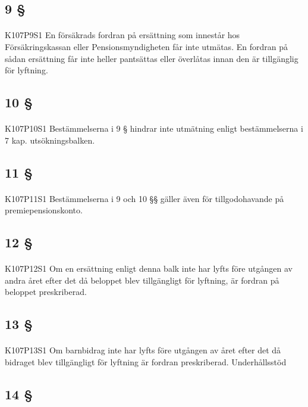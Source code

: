 \documentclass[a4paper,notitlepage,openany,10pt]{book}
\begin{document}
\subsection*{9 §}
\paragraph*{}
{\tiny K107P9S1}
En försäkrads fordran på ersättning som innestår hos Försäkringskassan eller Pensionsmyndigheten får inte utmätas.
En fordran på sådan ersättning får inte heller pantsättas eller överlåtas innan den är tillgänglig för lyftning.
\subsection*{10 §}
\paragraph*{}
{\tiny K107P10S1}
Bestämmelserna i 9 § hindrar inte utmätning enligt bestämmelserna i 7 kap. utsökningsbalken.
\subsection*{11 §}
\paragraph*{}
{\tiny K107P11S1}
Bestämmelserna i 9 och 10 §§ gäller även för tillgodohavande på premiepensionskonto.
\subsection*{12 §}
\paragraph*{}
{\tiny K107P12S1}
Om en ersättning enligt denna balk inte har lyfts före utgången av andra året efter det då beloppet blev tillgängligt för lyftning, är fordran på beloppet preskriberad.
\subsection*{13 §}
\paragraph*{}
{\tiny K107P13S1}
Om barnbidrag inte har lyfts före utgången av året efter det då bidraget blev tillgängligt för lyftning är fordran preskriberad.
Underhållsstöd
\subsection*{14 §}
\end{document}
